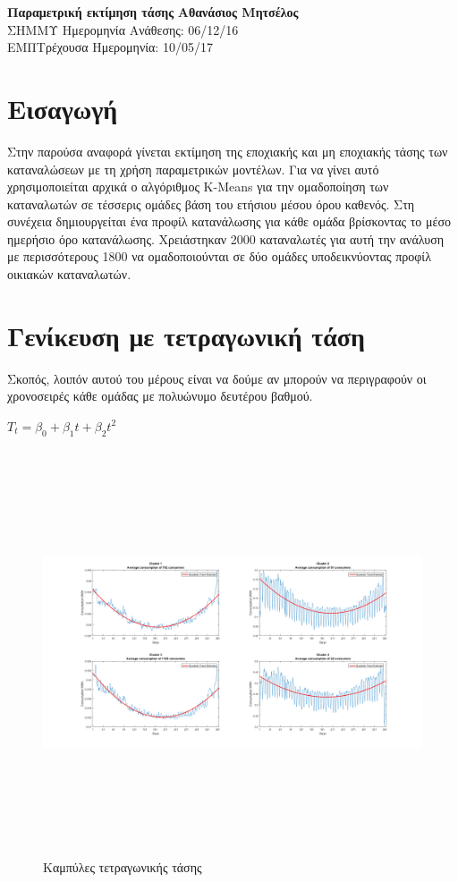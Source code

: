 \documentclass[a4paper, 11pt]{article}
\begin{document}
\noindent
\large\textbf{Παραμετρική εκτίμηση τάσης} \hfill \textbf{Αθανάσιος Μητσέλος} \\
\normalsize ΣΗΜΜΥ \hfill Ημερομηνία Ανάθεσης: 06/12/16  \\
ΕΜΠ\hfill Τρέχουσα Ημερομηνία: 10/05/17 

\section{Εισαγωγή}
Στην παρούσα αναφορά γίνεται εκτίμηση της εποχιακής και μη εποχιακής τάσης των καταναλώσεων με τη χρήση παραμετρικών μοντέλων. Για να γίνει αυτό χρησιμοποιείται αρχικά ο αλγόριθμος K-Means για την ομαδοποίηση των καταναλωτών σε τέσσερις ομάδες βάση του ετήσιου μέσου όρου καθενός. Στη συνέχεια δημιουργείται ένα προφίλ κατανάλωσης για κάθε ομάδα βρίσκοντας το μέσο ημερήσιο όρο κατανάλωσης. Χρειάστηκαν 2000 καταναλωτές για αυτή την ανάλυση με περισσότερους  1800 να ομαδοποιούνται σε δύο ομάδες υποδεικνύοντας προφίλ οικιακών καταναλωτών.

\section{Γενίκευση με τετραγωνική τάση}
Σκοπός, λοιπόν αυτού του μέρους είναι να δούμε αν μπορούν να περιγραφούν οι χρονοσειρές κάθε ομάδας με πολυώνυμο δευτέρου βαθμού. \cite{Estimation}
\begin{center}
$T_t=\beta_0 + \beta_1t + \beta_2t^2$
\end{center}
\begin{figure}[ht!]
\centering
\includegraphics[width=180mm, height=120mm]{../../plots/Trend_estimation/quadratic_Trend_ALL.png}
\caption{Καμπύλες τετραγωνικής τάσης\label{quaTrend}}
\end{figure}
\end{document}
